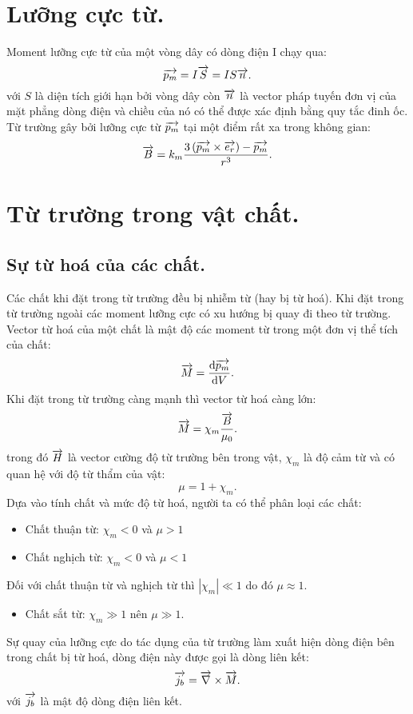 \begin{appendices}
    \section{Lưỡng cực từ.}
    Moment lưỡng cực từ của một vòng dây có dòng điện I chạy qua:
    $$\overrightarrow{p_m}=I\overrightarrow{S}=IS\overrightarrow{n}.$$
    với $S$ là diện tích giới hạn bởi vòng dây còn $\overrightarrow{n}$ là vector pháp tuyến đơn vị của mặt phẳng dòng điện và chiều của nó có thể được xác định bằng quy tắc đinh ốc.\\
    Từ trường gây bởi lưỡng cực từ $\overrightarrow{p_m}$ tại một điểm rất xa trong không gian:
    $$\overrightarrow{B}=k_m\dfrac{3\left(\overrightarrow{p_m}\times\overrightarrow{e_r}\right)-\overrightarrow{p_m}}{r^3}.$$
\section{Từ trường trong vật chất.}
\subsection{Sự từ hoá của các chất.}
    Các chất khi đặt trong từ trường đều bị nhiễm từ (hay bị từ hoá). Khi đặt trong từ trường ngoài các moment lưỡng cực có xu hướng bị quay đi theo từ trường.\\
    Vector từ hoá của một chất là mật độ các moment từ trong một đơn vị thể tích của chất:
    $$\overrightarrow{M}=\dfrac{\mathrm{d}\overrightarrow{p_m}}{\mathrm{d} V}.$$
    Khi đặt trong từ trường càng mạnh thì vector từ hoá càng lớn:
    $$\overrightarrow{M}=\chi_m\dfrac{\overrightarrow{B}}{\mu_0}.$$
    trong đó $\overrightarrow{H}$ là vector cường độ từ trường bên trong vật, $\chi_m$ là độ cảm từ và có quan hệ với độ từ thẩm của vật:
   $$\mu = 
      1+\chi_m.$$
    Dựa vào tính chất và mức độ từ hoá, người ta có thể phân loại các chất:
    \begin{itemize}
        \item Chất thuận từ: $\chi_m<0 $ và $\mu>1$
        \item Chất nghịch từ: $\chi_m < 0$ và $\mu<1$
    \end{itemize}
    Đối với chất thuận từ và nghịch từ thì $|\chi_m|\ll1$ do đó $\mu\approx 1.$
     \begin{itemize}
        \item Chất sắt từ: $\chi_m\gg 1$ nên $\mu\gg 1.$
    \end{itemize}
    Sự quay của lưỡng cực do tác dụng của từ trường làm xuất hiện dòng điện bên trong chất bị từ hoá, dòng điện này được gọi là dòng liên kết:
    $$\overrightarrow{j_b}=\overrightarrow{\nabla}\times\overrightarrow{M}.$$
    với $\overrightarrow{j_b}$ là mật độ dòng điện liên kết.

\end{appendices}
